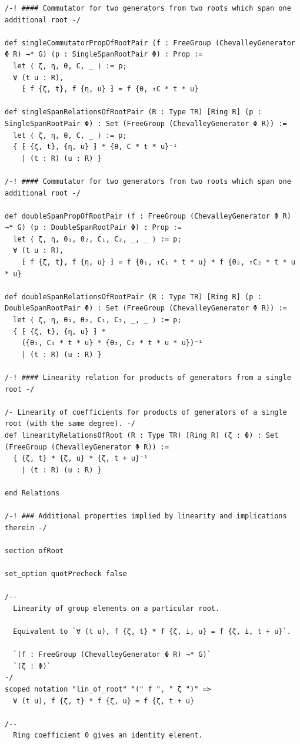 \begin{Verbatim}
/-! #### Commutator for two generators from two roots which span one additional root -/

def singleCommutatorPropOfRootPair (f : FreeGroup (ChevalleyGenerator Φ R) →* G) (p : SingleSpanRootPair Φ) : Prop :=
  let ⟨ ζ, η, θ, C, _ ⟩ := p;
  ∀ (t u : R),
    ⁅ f {ζ, t}, f {η, u} ⁆ = f {θ, ↑C * t * u}

def singleSpanRelationsOfRootPair (R : Type TR) [Ring R] (p : SingleSpanRootPair Φ) : Set (FreeGroup (ChevalleyGenerator Φ R)) :=
  let ⟨ ζ, η, θ, C, _ ⟩ := p;
  { ⁅ {ζ, t}, {η, u} ⁆ * {θ, C * t * u}⁻¹
    | (t : R) (u : R) }

/-! #### Commutator for two generators from two roots which span one additional root -/

def doubleSpanPropOfRootPair (f : FreeGroup (ChevalleyGenerator Φ R) →* G) (p : DoubleSpanRootPair Φ) : Prop :=
  let ⟨ ζ, η, θ₁, θ₂, C₁, C₂, _, _ ⟩ := p;
  ∀ (t u : R),
    ⁅ f {ζ, t}, f {η, u} ⁆ = f {θ₁, ↑C₁ * t * u} * f {θ₂, ↑C₂ * t * u * u}

def doubleSpanRelationsOfRootPair (R : Type TR) [Ring R] (p : DoubleSpanRootPair Φ) : Set (FreeGroup (ChevalleyGenerator Φ R)) :=
  let ⟨ ζ, η, θ₁, θ₂, C₁, C₂, _, _ ⟩ := p;
  { ⁅ {ζ, t}, {η, u} ⁆ *
    ({θ₁, C₁ * t * u} * {θ₂, C₂ * t * u * u})⁻¹
    | (t : R) (u : R) }

/-! #### Linearity relation for products of generators from a single root -/

/- Linearity of coefficients for products of generators of a single root (with the same degree). -/
def linearityRelationsOfRoot (R : Type TR) [Ring R] (ζ : Φ) : Set (FreeGroup (ChevalleyGenerator Φ R)) :=
  { {ζ, t} * {ζ, u} * {ζ, t + u}⁻¹
    | (t : R) (u : R) }

end Relations

/-! ### Additional properties implied by linearity and implications therein -/

section ofRoot

set_option quotPrecheck false

/--
  Linearity of group elements on a particular root.

  Equivalent to `∀ (t u), f {ζ, t} * f {ζ, i, u} = f {ζ, i, t + u}`.

  `(f : FreeGroup (ChevalleyGenerator Φ R) →* G)`
  `(ζ : Φ)`
-/
scoped notation "lin_of_root" "(" f ", " ζ ")" =>
  ∀ (t u), f {ζ, t} * f {ζ, u} = f {ζ, t + u}

/--
  Ring coefficient 0 gives an identity element.


\end{Verbatim}
